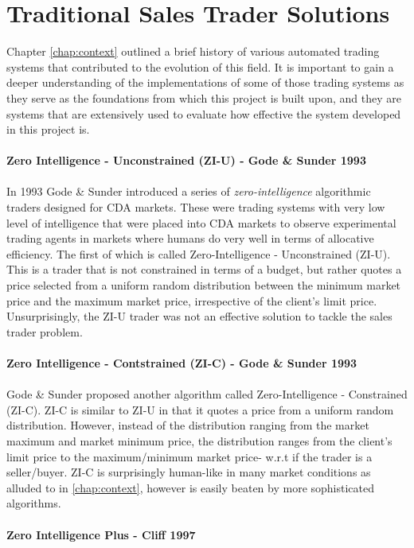\documentclass[ %
                    author={Ashwinder Khurana},
                supervisor={Prof Dave Cliff},
                    degree={MEng},
                     title={The Deeply Reinforced Trader},
                  subtitle={},
                      type={enterprise},
                      year={2020} ]{dissertation}
\begin{document}
\section{Traditional Sales Trader Solutions}
\label{section:Traditional Sales Trader Solutions}
Chapter \ref{chap:context} outlined a brief history of various automated trading systems that contributed to the evolution of this field. It is important to gain a deeper understanding of the implementations of some of those trading systems as they serve as the foundations from which this project is built upon, and they are systems that are extensively used to evaluate how effective the system developed in this project is. 
\\
\\
\textbf{Zero Intelligence - Unconstrained (ZI-U) - Gode \& Sunder 1993}
\\
\\
\noindent
In 1993 Gode \& Sunder introduced a series of \textit{zero-intelligence} algorithmic traders designed for CDA markets. These were trading systems with very low level of intelligence that were placed into CDA markets to observe experimental trading agents in  markets where humans do very well in terms of allocative efficiency. The first of which is called Zero-Intelligence - Unconstrained (ZI-U). This is a trader that is not constrained in terms of a budget, but rather quotes a price selected from a uniform random distribution between the minimum market price and the maximum market price, irrespective of the client's limit price. Unsurprisingly, the ZI-U trader was not an effective solution to tackle the sales trader problem. 
\\
\\
\textbf{Zero Intelligence - Contstrained (ZI-C) - Gode \& Sunder 1993}\\
\\
Gode \& Sunder proposed another algorithm called Zero-Intelligence - Constrained (ZI-C). ZI-C is similar to ZI-U in that it quotes a price from a uniform random distribution. However, instead of the distribution ranging from the market maximum and market minimum price, the distribution ranges from the client's limit price to the maximum/minimum market price- w.r.t if the trader is a seller/buyer. ZI-C is surprisingly human-like in many market conditions as alluded to in \ref{chap:context}, however is easily beaten by more sophisticated algorithms. 
\\
\\
\textbf{Zero Intelligence Plus - Cliff 1997}
\end{document}
